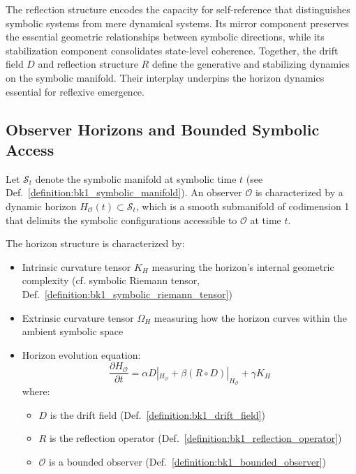 The reflection structure encodes the capacity for self-reference that distinguishes symbolic systems from mere dynamical systems. Its mirror component preserves the essential geometric relationships between symbolic directions, while its stabilization component consolidates state-level coherence. Together, the drift field \( D \) and reflection structure \( R \) define the generative and stabilizing dynamics on the symbolic manifold. Their interplay underpins the horizon dynamics essential for reflexive emergence.


\subsection{Observer Horizons and Bounded Symbolic Access}
\label{subsec:bk1_observer_horizons_bounded_access}

\begin{definition}
\label{definition:bk1_observer_horizon_structure}
Let $\mathcal{S}_t$ denote the symbolic manifold at symbolic time $t$ (see Def.~\ref{definition:bk1_symbolic_manifold}). An observer $\mathcal{O}$ is characterized by a dynamic horizon $H_\mathcal{O}(t) \subset \mathcal{S}_t$, which is a smooth submanifold of codimension 1 that delimits the symbolic configurations accessible to $\mathcal{O}$ at time $t$.

The horizon structure is characterized by:
\begin{itemize}
    \item Intrinsic curvature tensor $K_H$ measuring the horizon's internal geometric complexity (cf. symbolic Riemann tensor, Def.~\ref{definition:bk1_symbolic_riemann_tensor})
    \item Extrinsic curvature tensor $\Omega_H$ measuring how the horizon curves within the ambient symbolic space
    \item Horizon evolution equation:
    \[
    \frac{\partial H_\mathcal{O}}{\partial t} = \alpha D|_{H_\mathcal{O}} + \beta (R \circ D)|_{H_\mathcal{O}} + \gamma K_H
    \]
    where:
    \begin{itemize}
        \item \( D \) is the drift field (Def.~\ref{definition:bk1_drift_field})
        \item \( R \) is the reflection operator (Def.~\ref{definition:bk1_reflection_operator})
        \item \( \mathcal{O} \) is a bounded observer (Def.~\ref{definition:bk1_bounded_observer})
    \end{itemize}
\end{itemize}
\end{definition}

